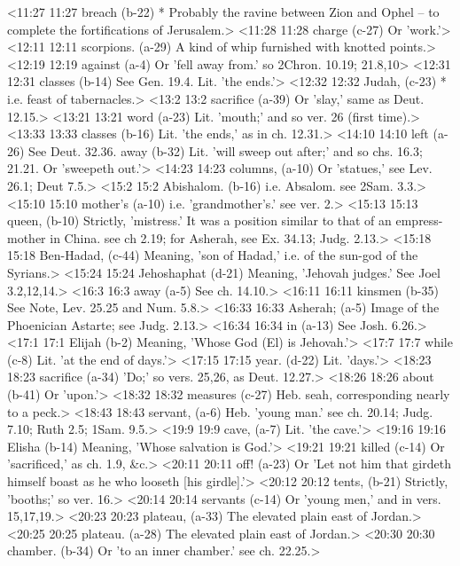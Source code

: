 <11:27 11:27  breach (b-22)  * Probably the ravine between Zion and Ophel -- to complete  the fortifications of Jerusalem.>
<11:28 11:28  charge (c-27)  Or 'work.'>
<12:11 12:11  scorpions. (a-29)  A kind of whip furnished with knotted points.>
<12:19 12:19  against (a-4)  Or 'fell away from.' so 2Chron. 10.19; 21.8,10>
<12:31 12:31  classes (b-14)  See Gen. 19.4. Lit. 'the ends.'>
<12:32 12:32  Judah, (c-23)  * i.e. feast of tabernacles.>
<13:2 13:2  sacrifice (a-39)  Or 'slay,' same as Deut. 12.15.>
<13:21 13:21  word (a-23)  Lit. 'mouth;' and so ver. 26 (first time).>
<13:33 13:33  classes (b-16)  Lit. 'the ends,' as in ch. 12.31.>
<14:10 14:10  left (a-26)  See Deut. 32.36.
  away (b-32)  Lit. 'will sweep out after;' and so chs. 16.3; 21.21. Or  'sweepeth out.'>
<14:23 14:23  columns, (a-10)  Or 'statues,' see Lev. 26.1; Deut 7.5.>
<15:2 15:2  Abishalom. (b-16)  i.e. Absalom. see 2Sam. 3.3.>
<15:10 15:10  mother's (a-10)  i.e. 'grandmother's.' see ver. 2.>
<15:13 15:13  queen, (b-10)  Strictly, 'mistress.' It was a position similar to that of an  empress-mother in China. see ch 2.19; for Asherah, see Ex.  34.13; Judg. 2.13.>
<15:18 15:18  Ben-Hadad, (c-44)  Meaning, 'son of Hadad,' i.e. of the sun-god of the Syrians.>
<15:24 15:24  Jehoshaphat (d-21)  Meaning, 'Jehovah judges.' See Joel 3.2,12,14.>
<16:3 16:3  away (a-5)  See ch. 14.10.>
<16:11 16:11  kinsmen (b-35)  See Note, Lev. 25.25 and Num. 5.8.>
<16:33 16:33  Asherah; (a-5)  Image of the Phoenician Astarte; see Judg. 2.13.>
<16:34 16:34  in (a-13)  See Josh. 6.26.>
<17:1 17:1  Elijah (b-2)  Meaning, 'Whose God (El) is Jehovah.'>
<17:7 17:7  while (c-8)  Lit. 'at the end of days.'>
<17:15 17:15  year. (d-22)  Lit. 'days.'>
<18:23 18:23  sacrifice (a-34)  'Do;' so vers. 25,26, as Deut. 12.27.>
<18:26 18:26  about (b-41)  Or 'upon.'>
<18:32 18:32  measures (c-27)  Heb. seah, corresponding nearly to a peck.>
<18:43 18:43  servant, (a-6)  Heb. 'young man.' see ch. 20.14; Judg. 7.10; Ruth 2.5; 1Sam. 9.5.>
<19:9 19:9  cave, (a-7)  Lit. 'the cave.'>
<19:16 19:16  Elisha (b-14)  Meaning, 'Whose salvation is God.'>
<19:21 19:21  killed (c-14)  Or 'sacrificed,' as ch. 1.9, &c.>
<20:11 20:11  off! (a-23)  Or 'Let not him that girdeth himself boast as he who looseth  [his girdle].'>
<20:12 20:12  tents, (b-21)  Strictly, 'booths;' so ver. 16.>
<20:14 20:14  servants (c-14)  Or 'young men,' and in vers. 15,17,19.>
<20:23 20:23  plateau, (a-33) The elevated plain east of Jordan.>
<20:25 20:25  plateau. (a-28)  The elevated plain east of Jordan.>
<20:30 20:30  chamber. (b-34)  Or 'to an inner chamber.' see ch. 22.25.>
